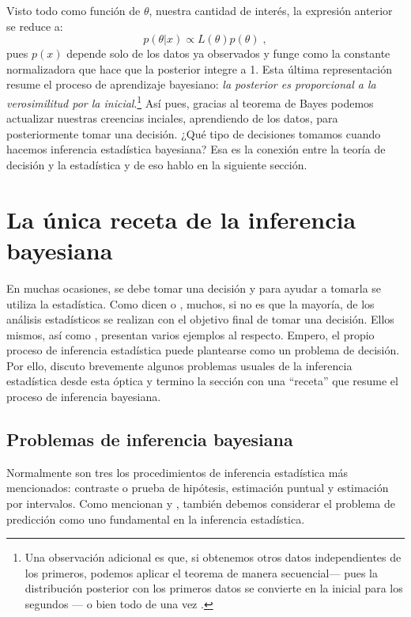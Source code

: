 Visto todo como función de $\theta$, nuestra cantidad de interés, la expresión anterior se reduce a:  
\begin{equation} \label{equation:Bayes_Prop}
p(\theta|x) \propto L(\theta)p(\theta)\;,
\end{equation}
pues $p(x)$ depende solo de los datos ya observados y funge como la constante normalizadora que hace que la posterior integre a 1. Esta última representación resume el proceso de aprendizaje bayesiano: \textit{la posterior es proporcional a la verosimilitud por la inicial}.\footnote{Una observación adicional es que, si obtenemos otros datos independientes de los primeros, podemos aplicar el teorema de manera secuencial--- pues la distribución posterior con los primeros datos se convierte en la inicial para los segundos --- o bien todo de una vez \parencites[37-39]{Lee12}[35-36]{GP16}[23]{Robert07}.} Así pues, gracias al teorema de Bayes podemos actualizar nuestras creencias inciales, aprendiendo de los datos, para posteriormente tomar una decisión. ¿Qué tipo de decisiones tomamos cuando hacemos inferencia estadística bayesiana? Esa es la conexión entre la teoría de decisión y la estadística y de eso hablo en la siguiente sección. 

\section{La única receta de la inferencia bayesiana}

En muchas ocasiones, se debe tomar una decisión y para ayudar a tomarla se utiliza la estadística. Como dicen \textcite[237]{Gelman13} o \textcite[1]{Robert07}, muchos, si no es que la mayoría, de los análisis estadísticos se realizan con el objetivo final de tomar una decisión. Ellos mismos, así como \textcite{Berger85}, presentan varios ejemplos al respecto. Empero, el propio proceso de inferencia estadística puede plantearse como un problema de decisión. Por ello, discuto brevemente algunos problemas usuales de la inferencia estadística desde esta óptica y termino la sección con una ``receta'' que resume el proceso de inferencia bayesiana.

\subsection{Problemas de inferencia bayesiana}

Normalmente son tres los procedimientos de inferencia estadística más mencionados: contraste o prueba de hipótesis, estimación puntual y estimación por intervalos. Como mencionan \textcite[58-59]{Mendoza11} y \textcite[7]{Robert07}, también debemos considerar el problema de predicción como uno fundamental en la inferencia estadística. 

